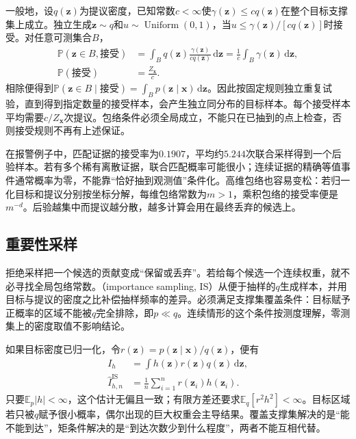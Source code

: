 一般地，设$q(\bm{z})$为提议密度，已知常数$c<\infty$使$\gamma(\bm{z})\leq c q(\bm{z})$在整个目标支撑集上成立。独立生成$\bm{z}\sim q$和$u\sim\operatorname{Uniform}(0,1)$，当$u\leq\gamma(\bm{z})/[c q(\bm{z})]$时接受。对任意可测集合$B$，
\begin{equation}
  \begin{aligned}
    \mathbb{P}(\bm{z}\in B,\text{接受})
      &=\int_B q(\bm{z})\frac{\gamma(\bm{z})}{c q(\bm{z})}
        \,\mathrm{d}\bm{z}
        =\frac{1}{c}\int_B\gamma(\bm{z})\,\mathrm{d}\bm{z},\\
    \mathbb{P}(\text{接受})&=\frac{Z_{\bm{x}}}{c}.
  \end{aligned}
  \label{eq:pgm-sampling-rejection}
\end{equation}
相除便得到$\mathbb{P}(\bm{z}\in B\mid\text{接受})=\int_B p(\bm{z}\mid\bm{x})\,\mathrm{d}\bm{z}$。因此按固定规则独立重复试验，直到得到指定数量的接受样本，会产生独立同分布的目标样本。每个接受样本平均需要$c/Z_{\bm{x}}$次提议。包络条件必须全局成立，不能只在已抽到的点上检查，否则接受规则不再有上述保证。

在报警例子中，匹配证据的接受率为$0.1907$，平均约$5.244$次联合采样得到一个后验样本。若有多个稀有离散证据，联合匹配概率可能很小；连续证据的精确等值事件通常概率为零，不能靠“恰好抽到观测值”条件化。高维包络也容易变松：若归一化目标和提议分别按坐标分解，每维包络常数为$m>1$，乘积包络的接受率便是$m^{-d}$。后验越集中而提议越分散，越多计算会用在最终丢弃的候选上。

\subsection{重要性采样}
\label{sec:pgm-sampling-importance}

拒绝采样把一个候选的贡献变成“保留或丢弃”。若给每个候选一个连续权重，就不必寻找全局包络常数。（importance sampling, IS）从便于抽样的$q$生成样本，并用目标与提议的密度之比补偿抽样频率的差异。必须满足支撑集覆盖条件：目标赋予正概率的区域不能被$q$完全排除，即$p\ll q$。连续情形的这个条件按测度理解，零测集上的密度取值不影响结论。

如果目标密度已归一化，令$r(\bm{z})=p(\bm{z}\mid\bm{x})/q(\bm{z})$，便有
\begin{equation}
  \begin{aligned}
    I_h&=\int h(\bm{z})r(\bm{z})q(\bm{z})\,\mathrm{d}\bm{z},\\
    \widehat I_{h,n}^{\mathrm{IS}}
      &=\frac{1}{n}\sum_{i=1}^{n}r(\bm{z}_i)h(\bm{z}_i).
  \end{aligned}
  \label{eq:pgm-sampling-is}
\end{equation}
只要$\mathbb{E}_p|h|<\infty$，这个估计无偏且一致；有限方差还要求$\mathbb{E}_q[r^2h^2]<\infty$。目标区域若只被$q$赋予很小概率，偶尔出现的巨大权重会主导结果。覆盖支撑集解决的是“能不能到达”，矩条件解决的是“到达次数少到什么程度”，两者不能互相代替。

